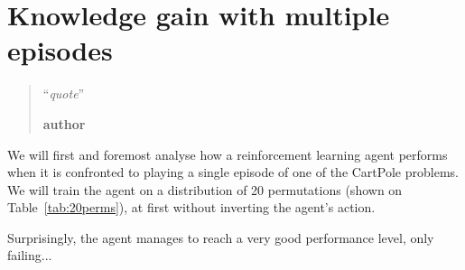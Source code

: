 \chapter{Knowledge gain with multiple episodes}
\begin{quotation}
\noindent ``\emph{quote}''
\begin{flushright}\textbf{author}\end{flushright}
\end{quotation}

We will first and foremost analyse how a reinforcement learning agent 
performs when it is confronted to playing a single episode of one of the 
CartPole problems. We will train the agent on a distribution of 20 permutations
(shown on Table~\ref{tab:20perms}), at first without inverting the agent's
action.

\begin{table}
	\centering
	\caption{State permutations used for training and testing}
	\label{tab:20perms}
\end{table}

Surprisingly, the agent manages to reach a very good performance level, only
failing...

